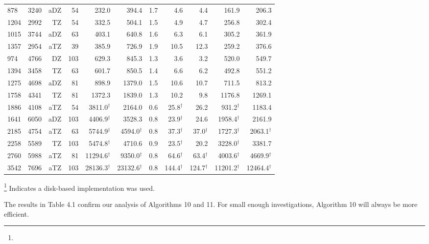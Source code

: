\begin{table}[H]
\begin{tabular}{lrrrrrrrrrr}
 878 & 3240  & aDZ  &  54 &                232.0 &              394.4 &  1.7   &               4.6 &               4.4 &              161.9 &              206.3\\
1204 & 2992  &  TZ  &  54 &                332.5 &              504.1 &  1.5   &               4.9 &               4.7 &              256.8 &              302.4\\
1015 & 3744  & aDZ  &  63 &                403.1 &              640.8 &  1.6   &               6.3 &               6.1 &              305.2 &              361.9\\
1357 & 2954  & aTZ  &  39 &                385.9 &              726.9 &  1.9   &              10.5 &              12.3 &              259.2 &              376.6\\
 974 & 4766  &  DZ  & 103 &                629.3 &              845.3 &  1.3   &               3.6 &               3.2 &              520.0 &              549.7\\
1394 & 3458  &  TZ  &  63 &                601.7 &              850.5 &  1.4   &               6.6 &               6.2 &              492.8 &              551.2\\
1275 & 4698  & aDZ  &  81 &                898.9 &             1379.0 &  1.5   &              10.6 &              10.7 &              711.5 &              813.2\\
1758 & 4341  &  TZ  &  81 &               1372.3 &             1839.0 &  1.3   &              10.2 &               9.8 &             1176.8 &             1269.1\\
1886 & 4108  & aTZ  &  54 &   3811.0$^{\dagger}$ &             2164.0 &  0.6   &  25.8$^{\dagger}$ &              26.2 &  931.2$^{\dagger}$ &             1183.4\\
1641 & 6050  & aDZ  & 103 &   4406.9$^{\dagger}$ &             3528.3 &  0.8   &  23.9$^{\dagger}$ &              24.6 & 1958.4$^{\dagger}$ &             2161.9\\
2185 & 4754  & aTZ  &  63 &   5744.9$^{\dagger}$ & 4594.0$^{\dagger}$ &  0.8   &  37.3$^{\dagger}$ &  37.0$^{\dagger}$ & 1727.3$^{\dagger}$ & 2063.1$^{\dagger}$\\
2258 & 5589  &  TZ  & 103 &   5474.8$^{\dagger}$ &             4710.6 &  0.9   &  23.5$^{\dagger}$ &              20.2 & 3228.0$^{\dagger}$ &             3381.7\\
2760 & 5988  & aTZ  &  81 &  11294.6$^{\dagger}$ & 9350.0$^{\dagger}$ &  0.8   &  64.6$^{\dagger}$ &  63.4$^{\dagger}$ & 4003.6$^{\dagger}$ & 4669.9$^{\dagger}$\\
3542 & 7696  & aTZ  & 103 &  28136.3$^{\dagger}$ &23132.6$^{\dagger}$ &  0.8   & 144.4$^{\dagger}$ & 124.7$^{\dagger}$ &11201.2$^{\dagger}$ &12464.4$^{\dagger}$\\

\hline
\end{tabular}
\renewcommand{\thefootnote}{\fnsymbol{footnote}}
\footnote[2]{} Indicates a disk-based implementation was used.
\end{table}
\endgroup

The results in Table 4.1 confirm our analysis of Algorithms 10 and 11. For small enough investigations, Algorithm 10 will always be more
efficient.
 
